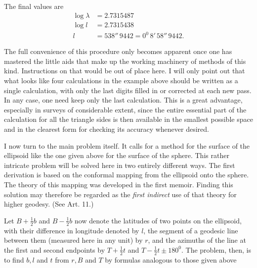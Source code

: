 %
The final values are
\[
\begin{aligned}
\log\lambda&=2.7315487\\
\log l&=2.7315438\\
l&=538''\,9442=0^0\,8'\,58''\,9442.
\end{aligned}
\]

\indent The full convenience of this procedure only becomes apparent once one has mastered the little aids that make up the working machinery of methods of this kind. Instructions on that would be out of place here. I will only point out that what looks like four calculations in the example above should be written as a single calculation, with only the last digits filled in or corrected at each new pass. In any case, one need keep only the last calculation. This is a great advantage, especially in surveys of considerable extent, since the entire essential part of the calculation for all the triangle sides is then available in the smallest possible space and in the clearest form for checking its accuracy whenever desired.

I now turn to the main problem itself. It calls for a method for the surface of the ellipsoid like the one given above for the surface of the sphere. This rather intricate problem will be solved here in two entirely different ways. The first derivation is based on the conformal mapping from the ellipsoid onto the sphere. The theory of this mapping was developed in the first memoir. Finding this solution may therefore be regarded as the \textit{first indirect} use of that theory for higher geodesy. (See Art. 11.)

Let \(B+\frac12b\) and \(B-\frac12b\) now denote the latitudes of two points on the ellipsoid, with their difference in longitude denoted by \(l\), the segment of a geodesic line between them (measured here in any unit) by \(r\), and the azimuths of the line at the first and second endpoints by \(T+\frac12t\) and \(T-\frac12t\pm180^0\). The problem, then, is to find \(b,l\) and \(t\) from \(r,B\) and \(T\) by formulas analogous to those given above
